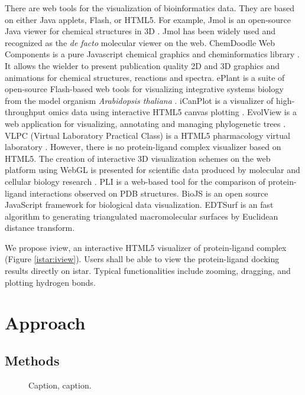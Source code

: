 \documentclass{bioinfo}
\begin{document}
There are web tools for the visualization of bioinformatics data. They are based on either Java applets, Flash, or HTML5. For example, Jmol is an open-source Java viewer for chemical structures in 3D \citep{1263}. Jmol has been widely used and recognized as the \textit{de facto} molecular viewer on the web. ChemDoodle Web Components is a pure Javascript chemical graphics and cheminformatics library \citep{1264}. It allows the wielder to present publication quality 2D and 3D graphics and animations for chemical structures, reactions and spectra.  ePlant is a suite of open-source Flash-based web tools for visualizing integrative systems biology from the model organism \textit{Arabidopsis thaliana} \citep{1242}. iCanPlot is a visualizer of high-throughput omics data using interactive HTML5 canvas plotting \citep{1028}. EvolView is a web application for visualizing, annotating and managing phylogenetic trees \citep{1241}. VLPC (Virtual Laboratory Practical Class) is a HTML5 pharmacology virtual laboratory \citep{1249}. However, there is no protein-ligand complex visualizer based on HTML5. The creation of interactive 3D visualization schemes on the web platform using WebGL is presented for scientific data produced by molecular and cellular biology research \citep{1262}. PLI \citep{1288} is a web-based tool for the comparison of protein-ligand interactions observed on PDB structures. BioJS \citep{1308} is an open source JavaScript framework for biological data visualization. EDTSurf \citep{1297} is an fast algorithm to generating triangulated macromolecular surfaces by Euclidean distance transform.

We propose iview, an interactive HTML5 visualizer of protein-ligand complex (Figure \ref{istar:iview}). Users shall be able to view the protein-ligand docking results directly on istar. Typical functionalities include zooming, dragging, and plotting hydrogen bonds.

\section{Approach}


\begin{methods}
\section{Methods}


\end{methods}

\begin{figure}[!tpb]%
\caption{Caption, caption.}\label{fig:01}
\end{figure}
\end{document}
